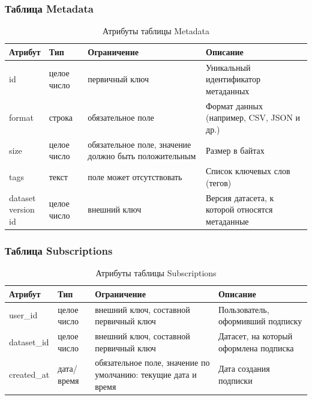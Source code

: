 \subsubsection*{Таблица Metadata}

\begin{table}[H]
\centering
\caption{Атрибуты таблицы Metadata}
\label{tab:metadata}
\renewcommand{\arraystretch}{1.3}
\begin{tabular}{|p{3.5cm}|p{3cm}|p{4cm}|p{4.5cm}|}
\hline
\textbf{Атрибут} & \textbf{Тип} & \textbf{Ограничение} & \textbf{Описание} \\
\hline
id & целое число & первичный ключ & Уникальный идентификатор метаданных \\
\hline
format & строка & обязательное поле & Формат данных (например, CSV, JSON и др.) \\
\hline
size & целое число & обязательное поле, значение должно быть положительным & Размер в байтах \\
\hline
tags & текст & поле может отсутствовать & Список ключевых слов (тегов) \\
\hline
\makecell[l]{dataset\\version\\id} & целое число & внешний ключ & Версия датасета, к которой относятся метаданные \\
\hline
\end{tabular}
\end{table}

\subsubsection*{Таблица Subscriptions}

\begin{table}[H]
\centering
\caption{Атрибуты таблицы Subscriptions}
\label{tab:subscriptions}
\renewcommand{\arraystretch}{1.3}
\begin{tabular}{|p{3.5cm}|p{3cm}|p{4cm}|p{4.5cm}|}
\hline
\textbf{Атрибут} & \textbf{Тип} & \textbf{Ограничение} & \textbf{Описание} \\
\hline
user\_id & целое число & внешний ключ, составной первичный ключ & Пользователь, оформивший подписку \\
\hline
dataset\_id & целое число & внешний ключ, составной первичный ключ & Датасет, на который оформлена подписка \\
\hline
created\_at & дата/время & обязательное поле, значение по умолчанию: текущие дата и время & Дата создания подписки \\
\hline
\end{tabular}
\end{table}

